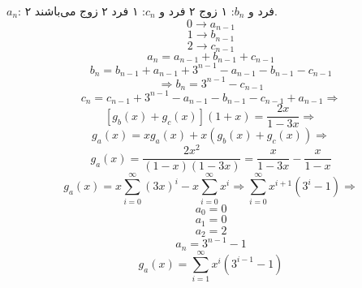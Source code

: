 \p
$a_n$:
۲ فرد و
$b_n$:
۱ زوج ۲ فرد و
$c_n$:
۱ فرد ۲ زوج می‌باشند.
$$0 \rightarrow a_{n-1}$$
$$1 \rightarrow b_{n-1}$$
$$2 \rightarrow c_{n-1}$$
$$a_n = a_{n-1} + b_{n-1} + c_{n-1}$$
$$b_n = b_{n-1} + a_{n-1} + 3^{n-1} - a_{n-1} - b_{n-1} - c_{n-1}$$
$$\Rightarrow b_n = 3^{n-1} - c_{n-1}$$
$$c_n = c_{n-1} + 3^{n-1} - a_{n-1} - b_{n-1} - c_{n-1} + a_{n-1}\Rightarrow$$
$$[g_b(x) + g_c(x)](1 + x) = \frac{2x}{1 - 3x} \Rightarrow$$
$$g_a(x) = xg_a(x) + x(g_b(x) + g_c(x)) \Rightarrow$$
$$ g_a(x) = \frac{2x^2}{(1-x)(1-3x)} = \frac{x}{1 - 3x} - \frac{x}{1 - x}$$
$$g_a(x) = x\sum_{i=0}^{\infty} (3x)^i - x\sum_{i=0}^{\infty} x^i \Rightarrow \sum_{i=0}^{\infty}x^{i+1}(3^i-1) \Rightarrow$$
$$a_0 = 0$$
$$a_1 = 0$$
$$a_2 = 2$$
$$a_n = 3^{n-1} - 1$$
$$g_a(x) = \sum_{i=1}^{\infty}x^i(3^{i-1} - 1)$$